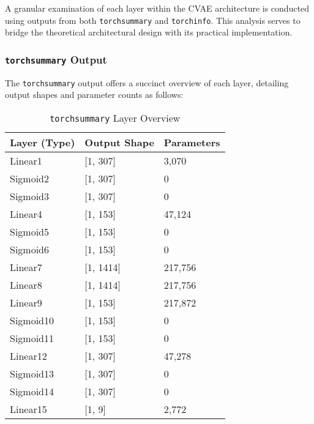 \documentclass[10pt]{article}
\begin{document}
A granular examination of each layer within the CVAE architecture is conducted using outputs from both \texttt{torchsummary} and \texttt{torchinfo}. This analysis serves to bridge the theoretical architectural design with its practical implementation.

\subsubsection{\texttt{torchsummary} Output}

The \texttt{torchsummary} output offers a succinct overview of each layer, detailing output shapes and parameter counts as follows:

\begin{table}[H]
\centering
\caption{\texttt{torchsummary} Layer Overview}
\begin{tabular}{@{}lll@{}}
\toprule
\textbf{Layer (Type)} & \textbf{Output Shape} & \textbf{Parameters} \\ \midrule
Linear1               & [1, 307]              & 3,070                \\
Sigmoid2              & [1, 307]              & 0                    \\
Sigmoid3              & [1, 307]              & 0                    \\
Linear4               & [1, 153]              & 47,124               \\
Sigmoid5              & [1, 153]              & 0                    \\
Sigmoid6              & [1, 153]              & 0                    \\
Linear7               & [1, 1414]             & 217,756              \\
Linear8               & [1, 1414]             & 217,756              \\
Linear9               & [1, 153]              & 217,872              \\
Sigmoid10             & [1, 153]              & 0                    \\
Sigmoid11             & [1, 153]              & 0                    \\
Linear12              & [1, 307]              & 47,278               \\
Sigmoid13             & [1, 307]              & 0                    \\
Sigmoid14             & [1, 307]              & 0                    \\
Linear15              & [1, 9]                & 2,772                \\

\end{tabular}
\end{table}
\end{document}
